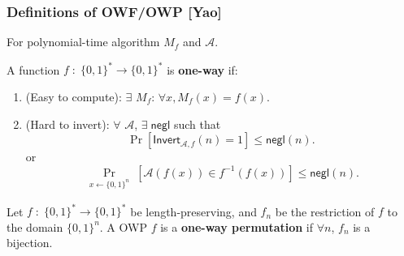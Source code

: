 \begin{frame}\frametitle{Definitions of OWF/OWP [Yao]}
For polynomial-time algorithm $M_f$ and $\mathcal{A}$.
\begin{definition}
A function $f\;:\; \{0,1\}^* \to \{0,1\}^*$ is \textbf{one-way} if:
\begin{enumerate}
\item (Easy to compute): $\exists$ $M_f$: $\forall x, M_f(x) = f(x)$.
\item (Hard to invert): $\forall$ $\mathcal{A}$, $\exists\;\mathsf{negl}$ such that
\[ \Pr[\mathsf{Invert}_{\mathcal{A},f}(n)=1] \le \mathsf{negl}(n). \]
or
\[ \Pr_{\substack{x \gets \{0,1\}^n}}[\mathcal{A}(f(x)) \in f^{-1}(f(x))] \le \mathsf{negl}(n). \]
\end{enumerate}
\end{definition}
\begin{definition}
Let $f\;:\; \{0,1\}^* \to \{0,1\}^*$ be length-preserving, and $f_n$ be the restriction of $f$ to the domain $\{0,1\}^n$. A OWP $f$ is a \textbf{one-way permutation} if $\forall n$, $f_n$ is a bijection.
\end{definition}
\end{frame}
